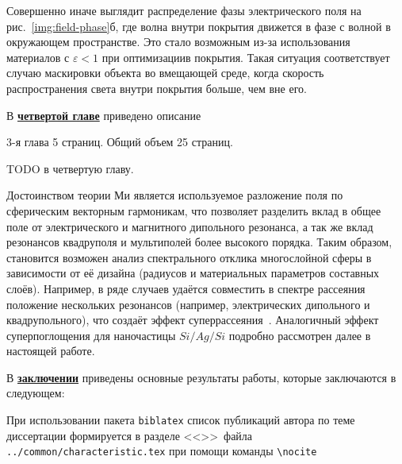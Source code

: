 Совершенно иначе выглядит распределение фазы электрического поля на
рис.~\ref{img:field-phase}б, где волна внутри покрытия движется в фазе
с волной в окружающем пространстве. Это стало возможным из-за
использования материалов с $\varepsilon < 1$ при оптимизациив
покрытия. Такая ситуация соответствует случаю маскировки объекта во
вмещающей среде, когда скорость распространения света внутри покрытия
больше, чем вне его.


В \underline{\textbf{четвертой главе}} приведено описание 

3-я глава 5 страниц. Общий объем 25 страниц.

TODO в четвертую главу.

 Достоинством теории Ми является используемое разложение
поля по сферическим векторным гармоникам, что позволяет разделить
вклад в общее поле от электрического и магнитного дипольного
резонанса, а так же вклад резонансов квадруполя и мультиполей более
высокого порядка. Таким образом, становится возможен анализ
спектрального отклика многослойной сферы в зависимости от её дизайна
(радиусов и материальных параметров составных слоёв). Например, в ряде
случаев удаётся совместить в спектре рассеяния положение нескольких
резонансов (например, электрических дипольного и квадрупольного), что
создаёт эффект суперрассеяния~\cite{Fan-2010,Fan-2011}. Аналогичный
эффект суперпоглощения для наночастицы $Si/Ag/Si$ подробно рассмотрен далее
в настоящей работе.


В \underline{\textbf{заключении}} приведены основные результаты работы, которые заключаются в следующем:



При использовании пакета \verb!biblatex! список публикаций автора по теме
диссертации формируется в разделе <<\publications>>\ файла
\verb!../common/characteristic.tex!  при помощи команды \verb!\nocite! 


